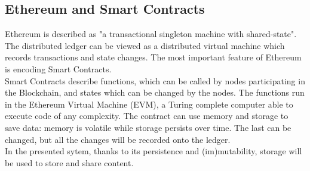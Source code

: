 \documentclass[hidelinks,conference,compsoc]{IEEEtran}
\begin{document}
\subsection{Ethereum and Smart Contracts}
Ethereum \cite{wood2014ethereum} is described as "a transactional singleton machine with shared-state". 
The distributed ledger can be viewed as a distributed virtual machine which records transactions and state changes.
The most important feature of Ethereum is encoding Smart Contracts.\\
Smart Contracts describe functions, which can be called by nodes participating in the Blockchain, and states which can be changed by the nodes. 
The functions run in the Ethereum Virtual Machine (EVM),
a Turing complete computer able to execute code of any complexity.
The contract can use memory and storage to save data: %
memory is volatile while storage persists over time. The last can be changed, but all the changes will be recorded onto the ledger.\\
In the presented sytem, thanks to its persistence and (im)mutability, storage will be used to store and share content. 
\end{document}
